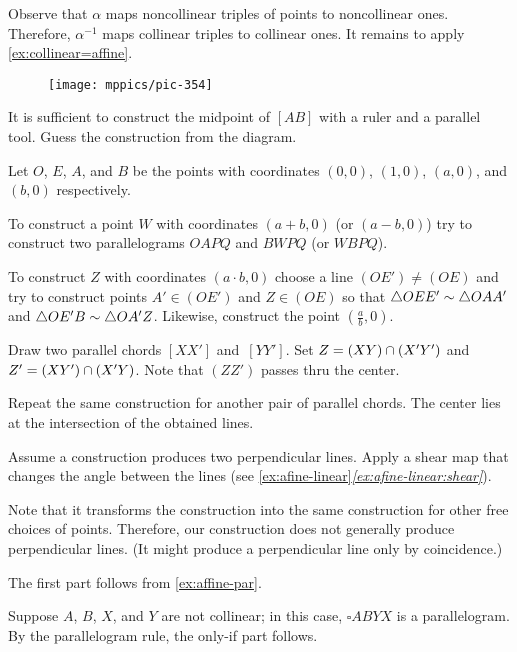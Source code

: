 Observe that $\alpha$ maps noncollinear triples of points to noncollinear ones.
Therefore, $\alpha^{-1}$ maps collinear triples to collinear ones.
It remains to apply \ref{ex:collinear=affine}.

{

\begin{wrapfigure}{r}{28mm}
\vskip-6mm
\centering
\texttt{[image: mppics/pic-354]}
\end{wrapfigure}

It is sufficient to construct the midpoint of $[AB]$
with a ruler and a parallel tool.
Guess the construction from the diagram.

}

Let $O$, $E$, $A$, and $B$ be the points with coordinates $(0,0)$, $(1,0)$, $(a,0)$, and $(b,0)$ respectively.

To construct a point $W$ with coordinates $(a+b,0)$ (or $(a-b,0)$) try to construct two parallelograms $OAPQ$ and $BWPQ$ (or $WBPQ$).

To construct $Z$ with coordinates $(a\cdot b,0)$
choose a line $(OE')\ne (OE)$
and try to construct points $A'\in (OE')$
and $Z \in(OE)$
so that 
$\triangle OEE'\sim \triangle OAA'$ and $\triangle OE'B\sim \triangle OA'Z$.
Likewise, construct the point $(\tfrac ab,0)$.

Draw two parallel chords $[XX']$ and~$[YY']$.
Set $Z=(XY)\cap (X'Y')$ and $Z'= (XY')\cap (X'Y)$.
Note that $(ZZ')$ passes thru the center.

Repeat the same construction for another pair of parallel chords.
The center lies at the intersection of the obtained lines.

Assume a construction produces two perpendicular lines.
Apply a shear map that changes the angle between the lines (see \ref{ex:afine-linear}\textit{\ref{ex:afine-linear:shear}}).

Note that it transforms the construction into the same construction for other free choices of points.
Therefore, our construction does not generally produce perpendicular lines.
(It might produce a perpendicular line only by coincidence.)
 
The first part follows from \ref{ex:affine-par}.

Suppose $A$, $B$, $X$, and $Y$ are not collinear;
in this case, $\square ABYX$ is a parallelogram.
By the parallelogram rule, the only-if part follows.

